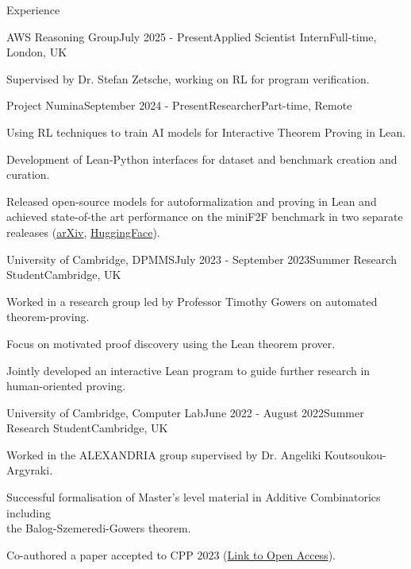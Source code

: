 \documentclass{resume} %
\begin{document}



\begin{rSection}{Experience}

\begin{rSubsection}{AWS Reasoning Group}{July 2025 - Present}{Applied Scientist Intern}{Full-time, London, UK}

\item Supervised by Dr. Stefan Zetsche, working on RL for program verification.

\end{rSubsection}

\begin{rSubsection}{Project Numina}{September 2024 - Present}{Researcher}{Part-time, Remote}
\item Using RL techniques to train AI models for Interactive Theorem Proving in Lean.
\item Development of Lean-Python interfaces for dataset and benchmark creation and curation.
\item Released open-source models for autoformalization and proving in Lean and achieved state-of-the art performance on the miniF2F benchmark in two separate realeases (\href{https://arxiv.org/abs/2504.11354}{arXiv}, \href{https://huggingface.co/blog/AI-MO/kimina-prover}{HuggingFace}).

\end{rSubsection}


\begin{rSubsection}{University of Cambridge, DPMMS}{July 2023 - September 2023}{Summer Research Student}{Cambridge, UK}
\item Worked in a research group led by Professor Timothy Gowers on automated theorem-proving.
\item Focus on motivated proof discovery using the Lean theorem prover.
\item Jointly developed an interactive Lean program to guide further research in human-oriented proving.
\end{rSubsection}


\begin{rSubsection}{University of Cambridge, Computer Lab}{June 2022 - August 2022}{Summer Research Student}{Cambridge, UK}
\item Worked in the ALEXANDRIA group supervised by Dr. Angeliki Koutsoukou-Argyraki.
\item Successful formalisation of Master's level material in Additive Combinatorics including \\ the Balog-Szemeredi-Gowers theorem.
\item Co-authored a paper accepted to CPP $2023$ (\href{https://dl.acm.org/doi/10.1145/3573105.3575680}{Link to Open Access}).


\end{rSubsection}
\end{rSection}
\end{document}
